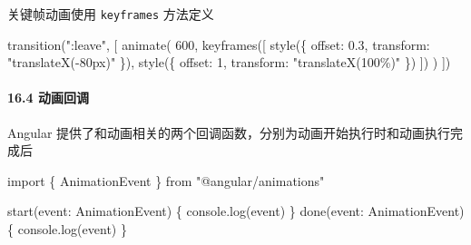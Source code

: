 \documentclass[
]{article}
\newenvironment{Shaded}{}{}
\newcommand{\BuiltInTok}[1]{#1}
\newcommand{\DataTypeTok}[1]{\textcolor[rgb]{0.56,0.13,0.00}{#1}}
\newcommand{\DecValTok}[1]{\textcolor[rgb]{0.25,0.63,0.44}{#1}}
\newcommand{\ErrorTok}[1]{\textcolor[rgb]{1.00,0.00,0.00}{\textbf{#1}}}
\newcommand{\FloatTok}[1]{\textcolor[rgb]{0.25,0.63,0.44}{#1}}
\newcommand{\FunctionTok}[1]{\textcolor[rgb]{0.02,0.16,0.49}{#1}}
\newcommand{\ImportTok}[1]{#1}
\newcommand{\KeywordTok}[1]{\textcolor[rgb]{0.00,0.44,0.13}{\textbf{#1}}}
\newcommand{\NormalTok}[1]{#1}
\newcommand{\OperatorTok}[1]{\textcolor[rgb]{0.40,0.40,0.40}{#1}}
\newcommand{\OtherTok}[1]{\textcolor[rgb]{0.00,0.44,0.13}{#1}}
\newcommand{\StringTok}[1]{\textcolor[rgb]{0.25,0.44,0.63}{#1}}
\begin{document}
关键帧动画使用 \texttt{keyframes} 方法定义

\begin{Shaded}
\begin{Highlighting}[]
\FunctionTok{transition}\NormalTok{(}\StringTok{":leave"}\OperatorTok{,}\NormalTok{ [}
  \FunctionTok{animate}\NormalTok{(}
    \DecValTok{600}\OperatorTok{,}
    \FunctionTok{keyframes}\NormalTok{([}
      \FunctionTok{style}\NormalTok{(\{ }\DataTypeTok{offset}\OperatorTok{:} \FloatTok{0.3}\OperatorTok{,} \DataTypeTok{transform}\OperatorTok{:} \StringTok{"translateX({-}80px)"}\NormalTok{ \})}\OperatorTok{,}
      \FunctionTok{style}\NormalTok{(\{ }\DataTypeTok{offset}\OperatorTok{:} \DecValTok{1}\OperatorTok{,} \DataTypeTok{transform}\OperatorTok{:} \StringTok{"translateX(100\%)"}\NormalTok{ \})}
\NormalTok{    ])}
\NormalTok{  )}
\NormalTok{])}
\end{Highlighting}
\end{Shaded}

\hypertarget{164-ux52a8ux753bux56deux8c03}{%
\paragraph{16.4 动画回调}\label{164-ux52a8ux753bux56deux8c03}}

Angular
提供了和动画相关的两个回调函数，分别为动画开始执行时和动画执行完成后

\begin{Shaded}
\end{Shaded}

\begin{Shaded}
\begin{Highlighting}[]
\ImportTok{import}\NormalTok{ \{ AnimationEvent \} }\ImportTok{from} \StringTok{"@angular/animations"}

\FunctionTok{start}\NormalTok{(}\BuiltInTok{event}\OperatorTok{:}\NormalTok{ AnimationEvent) \{}
  \BuiltInTok{console}\OperatorTok{.}\FunctionTok{log}\NormalTok{(}\BuiltInTok{event}\NormalTok{)}
\NormalTok{\}}
\FunctionTok{done}\NormalTok{(}\BuiltInTok{event}\OperatorTok{:}\NormalTok{ AnimationEvent) \{}
  \BuiltInTok{console}\OperatorTok{.}\FunctionTok{log}\NormalTok{(}\BuiltInTok{event}\NormalTok{)}
\NormalTok{\}}
\end{Highlighting}
\end{Shaded}
\end{document}
